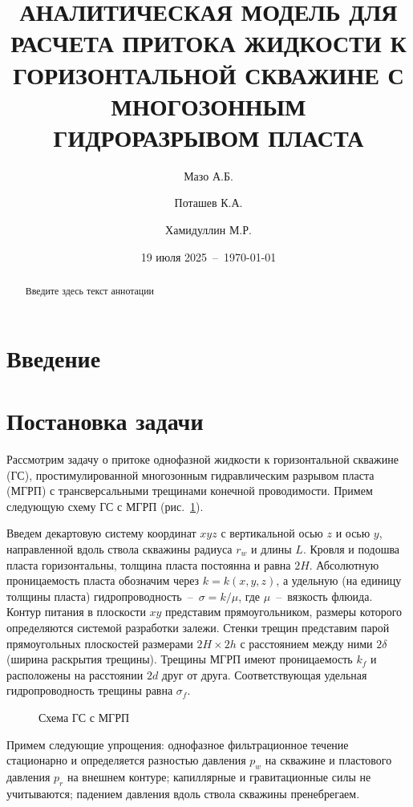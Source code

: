 \documentclass{article}
\title{АНАЛИТИЧЕСКАЯ МОДЕЛЬ ДЛЯ РАСЧЕТА ПРИТОКА ЖИДКОСТИ
К ГОРИЗОНТАЛЬНОЙ СКВАЖИНЕ С МНОГОЗОННЫМ ГИДРОРАЗРЫВОМ ПЛАСТА}
\author[1]{Мазо А.Б.}
\author[1]{Поташев К.А.}
\author[2]{Хамидуллин М.Р.}
\affil[1]{Казанский федеральный университет, Казань, Россия}
\affil[2]{Научно-исследовательский центр ``Курчатовский институт''}
\date{19 июля 2025~--~\today}
\begin{document}
\maketitle

\tableofcontents

\listoffigures

\listoftables

\begin{abstract}
	Введите здесь текст аннотации
\end{abstract}

\section*{Введение}

\section{Постановка задачи}

Рассмотрим задачу о притоке однофазной жидкости к горизонтальной скважине (ГС),
простимулированной многозонным гидравлическим разрывом пласта (МГРП)
с трансверсальными трещинами конечной проводимости. Примем следующую схему
ГС с МГРП (рис.~\ref{fig:kham_main_scheme}).

Введем декартовую систему координат $xyz$ с вертикальной осью $z$ и осью $y$,
направленной вдоль ствола скважины радиуса $r_w$ и длины $L$.
Кровля и подошва пласта горизонтальны, толщина пласта постоянна и равна $2H$.
Абсолютную проницаемость пласта обозначим через $k=k\left(x,y,z\right)$,
а удельную (на единицу толщины пласта)
гидропроводность~--~$\sigma = k / \mu$, где $\mu$~--~вязкость флюида.
Контур питания в плоскости $xy$ представим прямоугольником, размеры которого
определяются системой разработки залежи. Стенки трещин представим парой
прямоугольных плоскостей размерами $2H \times 2h$ с расстоянием между
ними $2\delta$ (ширина раскрытия трещины). Трещины МГРП имеют проницаемость
$k_f$ и расположены на расстоянии $2d$ друг от друга. Соответствующая удельная гидропроводность
трещины равна $\sigma_f$.

\begin{figure}[H]
	\centering
	
	\caption{Схема ГС с МГРП}
	\label{fig:kham_main_scheme} %
\end{figure}

Примем следующие упрощения: однофазное фильтрационное течение стационарно
и определяется разностью давления $p_w$ на скважине и пластового давления
$p_r$ на внешнем контуре; капиллярные и гравитационные силы не учитываются;
падением давления вдоль ствола скважины пренебрегаем.
\end{document}
